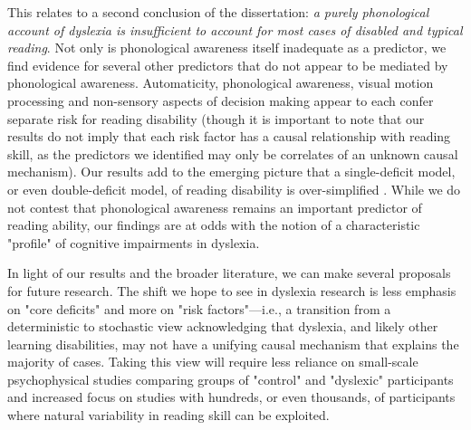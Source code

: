 \documentclass[../uwthesis.tex]{subfiles}
\begin{document}
This relates to a second conclusion of the dissertation: \emph{a purely phonological account of dyslexia is insufficient to account for most cases of disabled and typical reading}. Not only is phonological awareness itself inadequate as a predictor, we find evidence for several other predictors that do not appear to be mediated by phonological awareness. Automaticity, phonological awareness, visual motion processing and non-sensory aspects of decision making appear to each confer separate risk for reading disability (though it is important to note that our results do not imply that each risk factor has a causal relationship with reading skill, as the predictors we identified may only be correlates of an unknown causal mechanism). Our results add to the emerging picture that a single-deficit model, or even double-deficit model, of reading disability is over-simplified \citep{Pennington2012IndividualModels.,Peterson2015DevelopmentalDyslexia,Ziegler2019ModelingDyslexia}. While we do not contest that phonological awareness remains an important predictor of reading ability, our findings are at odds with the notion of a characteristic "profile" of cognitive impairments in dyslexia.

In light of our results and the broader literature, we can make several proposals for future research. The shift we hope to see in dyslexia research is less emphasis on "core deficits" and more on "risk factors"---i.e., a transition from a deterministic to stochastic view acknowledging that dyslexia, and likely other learning disabilities, may not have a unifying causal mechanism that explains the majority of cases. Taking this view will require less reliance on small-scale psychophysical studies comparing groups of "control" and "dyslexic" participants and increased focus on studies with hundreds, or even thousands, of participants where natural variability in reading skill can be exploited. 
\end{document}
